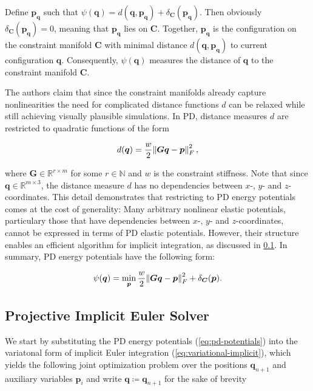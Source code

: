 \noindent Define $\bm{p_{\bm{q}}}$ such that $\psi({\bm{q}}) = d(\bm{q}, \bm{p_{\bm{q}}}) + \delta_{\bm{C}}(\bm{p_{\bm{q}}})$. Then obviously 
$\delta_{\bm{C}}(\bm{p_{\bm{q}}}) = 0$, meaning that $\bm{p_{\bm{q}}}$ lies on $\bm{C}$. Together, $\bm{p_{\bm{q}}}$ is the 
configuration on the constraint manifold $\bm{C}$ with minimal distance $d(\bm{q}, \bm{p_{\bm{q}}})$ to current configuration $\bm{q}$.
Consequently, $\psi(\bm{q})$ measures the distance of $\bm{q}$ to the constraint manifold $\bm{C}$.

The authors claim that since the constraint manifolds already capture nonlinearities the need for complicated distance functions $d$
can be relaxed while still achieving visually plausible simulations. In PD, distance measures $d$ are restricted to quadratic functions 
of the form

\[
    d(\bm{q}) = \frac{w}{2} \norm{\bm{Gq} - \bm{p}}^2_F,
\]

\noindent where $\bm{G} \in \mathbb{R}^{r \times m}$ for some $r \in \mathbb{N}$ and $w$ is the constraint stiffness. Note that 
since $\bm{q} \in \mathbb{R}^{m \times 3}$, the distance measure $d$ has no dependencies between $x$-, $y$- and 
$z$-coordinates. This detail demonstrates that restricting to PD energy potentials comes at the cost of generality: Many arbitrary 
nonlinear elastic potentials, particulary those that have dependencies between $x$-, $y$- and $z$-coordinates, cannot be expressed 
in terms of PD elastic potentials. However, their structure enables an efficient algorithm for implicit integration, as discussed in
\cref{ss:pd-solver}. In summary, PD energy potentials have the following form:

\begin{equation}\label{eq:pd-potentials}
    \psi({\bm{q}}) = \min_{\bm{p}} \frac{w}{2} \norm{\bm{Gq} - \bm{p}}^2_F + \delta_{\bm{C}}(\bm{p}).
\end{equation}

\subsection{Projective Implicit Euler Solver}\label{ss:pd-solver}
We start by substituting the PD energy potentials (\cref{eq:pd-potentials}) into the variatonal form of implicit Euler integration
(\cref{eq:variational-implicit}), which yields the following joint 
optimization problem over the positions $\bm{q}_{n+1}$ and auxiliary variables $\bm{p}_i$ and write $\bm{q} \coloneqq \bm{q}_{n+1}$ 
for the sake of brevity

